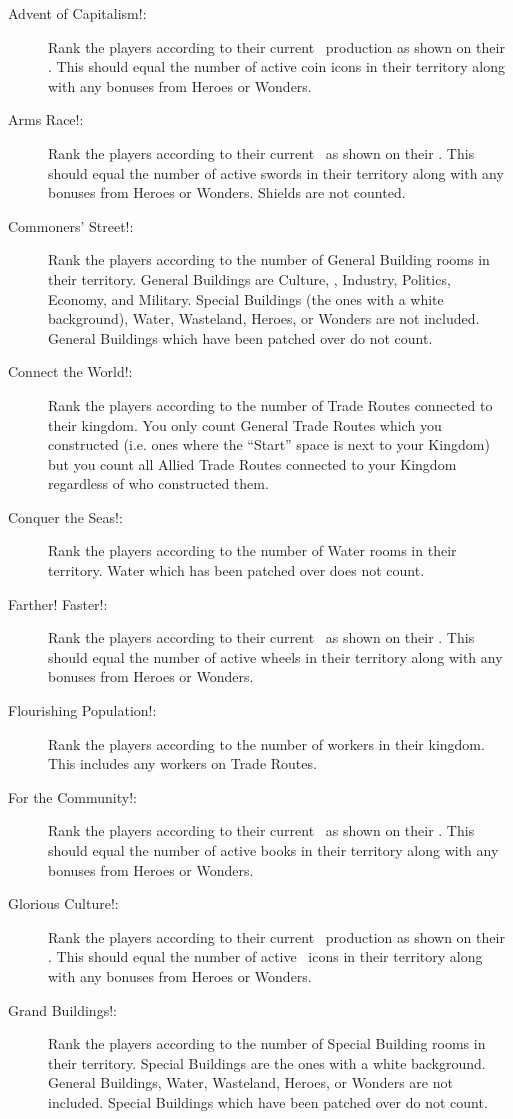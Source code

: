 \documentclass[10pt,twocolumn]{article}
\begin{document}
{\begin{description}
\item[Advent of Capitalism!:] Rank the players according to their current \money\ production as shown on their \psb. This should equal the number of active coin icons in their territory along with any bonuses from Heroes or Wonders.
\item[Arms Race!:] Rank the players according to their current \mil\ as shown on their \psb. This should equal the number of active swords in their territory along with any bonuses from Heroes or Wonders. Shields are not counted.
\item[Commoners' Street!:] Rank the players according to the number of General Building rooms in their territory. General Buildings are Culture, \traffic, Industry, Politics, Economy, and Military. Special Buildings (the ones with a white background), Water, Wasteland, Heroes, or Wonders are not included. General Buildings which have been patched over do not count.
\item[Connect the World!:] Rank the players according to the number of Trade Routes connected to their kingdom. You only count General Trade Routes which you constructed (i.e. ones where the ``Start'' space is next to your Kingdom) but you count all Allied Trade Routes connected to your Kingdom regardless of who constructed them.
\item[Conquer the Seas!:] Rank the players according to the number of Water rooms in their territory. Water which has been patched over does not count.
\item[Farther! Faster!:] Rank the players according to their current \tra\ as shown on their \psb. This should equal the number of active wheels in their territory along with any bonuses from Heroes or Wonders.
\item[Flourishing Population!:] Rank the players according to the number of workers in their kingdom. This includes any workers on Trade Routes.
\item[For the Community!:] Rank the players according to their current \pol\ as shown on their \psb. This should equal the number of active books in their territory along with any bonuses from Heroes or Wonders.
\item[Glorious Culture!:] Rank the players according to their current \victorypoint\ production as shown on their \psb. This should equal the number of active \victorypoint\ icons in their territory along with any bonuses from Heroes or Wonders.
\item[Grand Buildings!:] Rank the players according to the number of Special Building rooms in their territory. Special Buildings are the ones with a white background. General Buildings, Water, Wasteland, Heroes, or Wonders are not included. Special Buildings which have been patched over do not count.

\end{description}}
\end{document}
